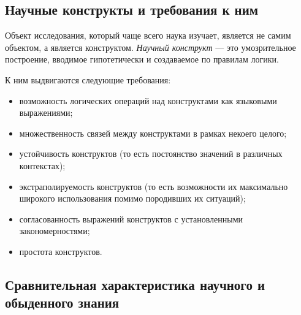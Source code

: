 \subsection{Научные конструкты и требования к ним}

Объект
исследования, который чаще всего наука изучает, является не самим объектом, а
является конструктом.
\textit{Научный конструкт} --- это умозрительное построение, вводимое гипотетически
и создаваемое по правилам логики. 

К ним выдвигаются следующие требования:
\begin{itemize}
    \item возможность логических операций над конструктами как языковыми выражениями;
    \item множественность связей между конструктами в рамках некоего целого;
    \item устойчивость конструктов (то есть постоянство значений в различных контекстах);
    \item экстраполируемость конструктов (то есть возможности их максимально широкого использования помимо породивших их ситуаций);
    \item согласованность выражений конструктов с установленными закономерностями;
    \item простота конструктов.
\end{itemize}

\subsection{Сравнительная характеристика
научного и обыденного знания}

